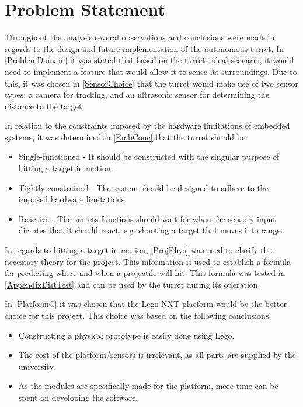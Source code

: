 \chapter{Problem Statement}


Throughout the analysis several observations and conclusions were made in
regards to the design and future implementation of the autonomous turret. In
\autoref{ProblemDomain} it was stated that based on the turrets ideal scenario,
it would need to implement a feature that would allow it to sense its
surroundings. Due to this, it was chosen in \autoref{SensorChoice} that the
turret would make use of two sensor types: a camera for tracking, and an
ultrasonic sensor for determining the distance to the target.\nl


In relation to the constraints imposed by the hardware limitations of
embedded systems, it was determined in \autoref{EmbConc} that the turret should
be:
\begin{itemize}
  \item Single-functioned - It should be constructed with the singular purpose
  of hitting a target in motion.
  \item Tightly-constrained - The system should be designed to adhere to the
  imposed hardware limitations.
  \item Reactive - The turrets functions should wait for when the sensory input
  dictates that it should react, e.g. shooting a target that moves into range. 
\end{itemize}\nl

In regards to hitting a target in motion, \autoref{ProjPhys} was used to
clarify the necessary theory for the project. This information is used to
establish a formula for predicting where and when a projectile will hit. This
formula was tested in \autoref{AppendixDistTest} and can be used by the turret
during its operation.\nl

In \autoref{PlatformC} it was chosen that the Lego NXT placform would be the
better choice for this project. This choice was based on the following
conclusions:
\begin{itemize}
  \item Constructing a physical prototype is easily done using Lego.
  \item The cost of the platform/sensors is irrelevant, as all parts are
  supplied by the university.
  \item As the modules are specifically made for the platform, more time can be
  spent on developing the software.
\end{itemize}\nl


